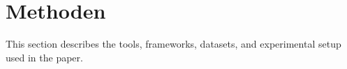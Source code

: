 \section{Methoden}

This section describes the tools, frameworks, datasets, and experimental setup used in the paper.